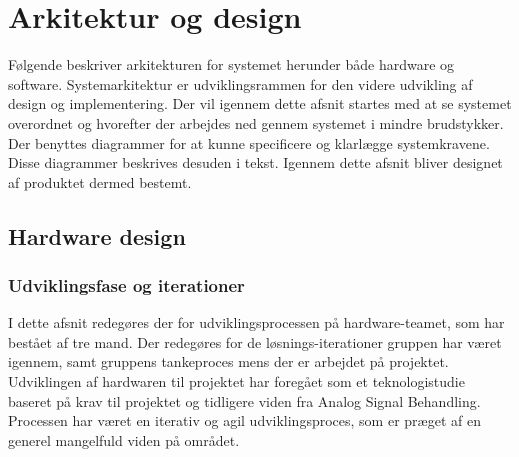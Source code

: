 \chapter{Arkitektur og design}
Følgende beskriver arkitekturen for systemet herunder både hardware og software. 
Systemarkitektur er udviklingsrammen for den videre udvikling af design og implementering. Der vil igennem dette afsnit startes med at se systemet overordnet og hvorefter der arbejdes ned gennem systemet i mindre brudstykker. Der benyttes diagrammer for at kunne specificere og klarlægge systemkravene. Disse diagrammer beskrives desuden i tekst. Igennem dette afsnit bliver designet af produktet dermed bestemt.
\section{Hardware design}
\subsection{Udviklingsfase og iterationer}
I dette afsnit redegøres der for udviklingsprocessen på hardware-teamet, som har bestået af tre mand. Der redegøres for de løsnings-iterationer gruppen har været igennem, samt gruppens tankeproces mens der er arbejdet på projektet. Udviklingen af hardwaren til projektet har foregået som et teknologistudie baseret på krav til projektet og tidligere viden fra Analog Signal Behandling. Processen har været en iterativ og agil udviklingsproces, som er præget af en generel mangelfuld viden på området.
